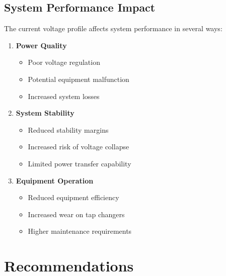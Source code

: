 \documentclass[11pt]{article}
\begin{document}
\subsection{System Performance Impact}
The current voltage profile affects system performance in several ways:
\begin{enumerate}
    \item \textbf{Power Quality}
    \begin{itemize}
        \item Poor voltage regulation
        \item Potential equipment malfunction
        \item Increased system losses
    \end{itemize}
    
    \item \textbf{System Stability}
    \begin{itemize}
        \item Reduced stability margins
        \item Increased risk of voltage collapse
        \item Limited power transfer capability
    \end{itemize}
    
    \item \textbf{Equipment Operation}
    \begin{itemize}
        \item Reduced equipment efficiency
        \item Increased wear on tap changers
        \item Higher maintenance requirements
    \end{itemize}
\end{enumerate}

\section{Recommendations}
\end{document}

